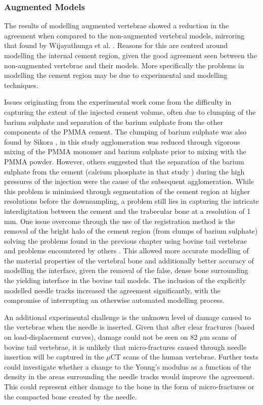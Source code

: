 \subsubsection{Augmented Models}

The results of modelling augmented vertebrae showed a reduction in the
agreement when compared to the non-augmented vertebral models, mirroring that
found by Wijayathunga et al. \cite{Wijayathunga2008}.
Reasons for this are centred
around modelling the internal cement region, given the good agreement seen
between the non-augmented vertebrae and their models.  More specifically the
problems in modelling the cement region may be due to experimental and
modelling techniques.  

Issues originating from the experimental work come from the difficulty in
capturing the extent of the injected cement volume, often due to clumping of
the barium sulphate and separation of the barium sulphate from the other
components of the PMMA cement.  The clumping of barium sulphate was also found
by Sikora \cite{Sikora2013a}, in this study agglomeration was reduced through
vigorous mixing of the PMMA monomer and barium sulphate prior to mixing with
the PMMA powder. However, others suggested that the separation of the barium
sulphate from the cement (calcium phosphate in that study
\cite{tarsuslugil2013development}) during the high pressures of the injection
were the cause of the subsequent agglomeration.  While this problem is
minimised through segmentation of the cement region at higher resolutions
before the downsampling, a problem still lies in capturing the intricate
interdigitation between the cement and the trabecular bone at a resolution of 1
mm.  One issue overcome through the use of the registration method is the
removal of the bright halo of the cement region (from clumps of barium
sulphate) solving the problems found in the previous chapter using bovine tail
vertebrae and problems encountered by others \cite{Wijayathunga2008,Sikora2013a}.
This allowed more accurate modelling of the material
properties of the vertebral bone and additionally better accuracy of modelling
the interface, given the removal of the false, dense bone surrounding the
yielding interface in the bovine tail models. The inclusion of the explicitly
modelled needle tracks increased the agreement significantly, with the
compromise of interrupting an otherwise automated modelling process.

An additional experimental challenge is the unknown level of damage caused to
the vertebrae when the needle is inserted.  Given that after clear fractures
(based on load-displacement curves), damage could not be seen on 82 $\mu$m
scans of bovine tail vertebrae, it is unlikely that micro-fractures caused
through needle insertion will be captured in the $\mu$CT scans of the human
vertebrae. Further tests could investigate whether a change to the Young's
modulus as a function of the density in the areas surrounding the needle tracks
would improve the agreement. This could represent either damage to the bone in
the form of micro-fractures or the compacted bone created by the needle.

